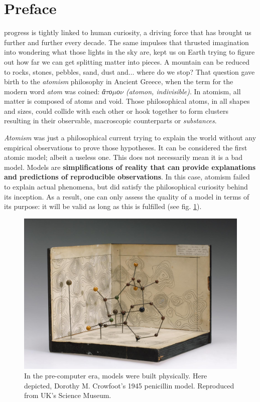 
\chapter*{Preface}
\label{chap:preface}

 progress is tightly linked to human curiosity, a driving force that has brought us further and further every decade. The same impulses that thrusted imagination into wondering what those lights in the sky are, kept us on Earth trying to figure out how far we can get splitting matter into pieces. A mountain can be reduced to rocks, stones, pebbles, sand, dust and$ \ldots $  where do we stop? That question gave birth to the \textit{atomism} philosophy in Ancient Greece, when the term for the modern word \textit{atom} was coined: \textit{ἄ$\tau$ο$\mu$ο$\nu$ (atomon, indivisible)}. In atomism, all matter is composed of atoms and void. Those philosophical atoms, in all shapes and sizes, could collide with each other or hook together to form clusters resulting in their observable, macroscopic counterparts or \textit{substances}.

\textit{Atomism} was just a philosophical current trying to explain the world without any empirical observations to prove those hypotheses. It can be considered the first atomic model; albeit a useless one. This does not necessarily mean it is a bad model. Models are \textbf{simplifications of reality that can provide explanations and predictions of reproducible observations}. In this case, atomism failed to explain actual phenomena, but did satisfy the philosophical curiosity behind its inception. As a result, one can only assess the quality of a model in terms of its purpose: it will be valid as long as this is fulfilled (see fig. \ref{fig:penicillin}).



\begin{figure}[H]
	\includegraphics[width=\textwidth]{./figures/01/penicillin.jpg}
	\cprotect\caption[Dorothy M. Crowfoot's 1945 Penicillin model]{In the pre-computer era, models were built physically. Here depicted, Dorothy M. Crowfoot's 1945 penicillin model. Reproduced from UK's Science Museum.\cite{uksciencemuseum}}
	\label{fig:penicillin}
\end{figure}


